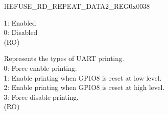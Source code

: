 \begin{register}{H}{EFUSE\_RD\_REPEAT\_DATA2\_REG}{0x0038}
\begin{regdesc}
\begin{reglist}
    1: Enabled\\
    0: Disabled\\
    (RO)
    \label{fielddesc:EFUSEUARTPRINTCONTROL}\item [EFUSE\_UART\_PRINT\_CONTROL] Represents the types of UART printing.\\
    0: Force enable printing. \\
    1: Enable printing when GPIO8 is reset at low level.\\
    2: Enable printing when GPIO8 is reset at high level.\\
    3: Force disable printing.\\
    (RO)

    \item [Continued on the next page...]
    \end{reglist}\end{regdesc}
    \end{register}

